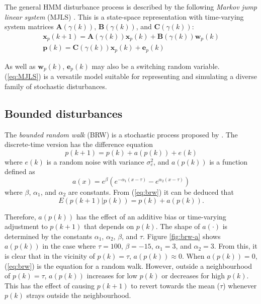 The general HMM disturbance process is described by the following \textit{Markov jump linear system} (MJLS) \citep{costa_discrete-time_2005}. This is a state-space representation with time-varying system matrices $\mathbf{A}(\gamma(k))$, $\mathbf{B}(\gamma(k))$, and $\mathbf{C}(\gamma(k))$:
\begin{equation} \label{eq:MJLS}
	\begin{split}
	\mathbf{x}_p(k+1) = \mathbf{A}(\gamma(k)) \mathbf{x}_p(k) + \mathbf{B}(\gamma(k))\mathbf{w}_p(k) \\
	\mathbf{p}(k) = \mathbf{C}(\gamma(k)) \mathbf{x}_p(k) + \mathbf{e}_p(k)
	\end{split}
\end{equation}

As well as $\mathbf{w}_p(k)$, $\mathbf{e}_p(k)$ may also be a switching random variable. (\ref{eq:MJLS}) is a versatile model suitable for representing and simulating a diverse family of stochastic disturbances.

\subsection{Bounded disturbances}

The \textit{bounded random walk} (BRW) is a stochastic process proposed by \cite{nicolau_stationary_2002}. The discrete-time version has the difference equation
\begin{equation} \label{eq:brw}
		p(k+1) = p(k) + a(p(k)) + e(k)
\end{equation}
where $e(k)$ is a random noise with variance $\sigma_e^2$, and $a(p(k))$ is a function defined as
\begin{equation}
	a(x) = e^{\beta}\left(e^{-\alpha_{1}\left(x - \tau\right)} - e^{\alpha_{2}\left(x - \tau\right)}\right)
\end{equation}
where $\beta$, $\alpha_{1}$, and $\alpha_{2}$ are constants.  From (\ref{eq:brw}) it can be deduced that
\begin{equation}
	E(p(k+1)|p(k)) = p(k) + a(p(k)).
\end{equation}

Therefore, $a(p(k))$ has the effect of an additive bias or time-varying adjustment to $p(k+1)$ that depends on $p(k)$. The shape of $a(\cdot)$ is determined by the constants $\alpha_{1}$,  $\alpha_{2}$, $\beta$, and $\tau$. Figure \ref{fig:brw-a} shows $a(p(k))$ in the case where $\tau=100$, $\beta=-15$, $\alpha_{1}=3$, and $\alpha_{2}=3$.  From this, it is clear that in the vicinity of $p(k)=\tau$, $a(p(k))\approx0$. When $a(p(k))=0$, (\ref{eq:brw}) is the equation for a random walk. However, outside a neighbourhood of $p(k)=\tau$, $a(p(k))$ increases for low $p(k)$ or decreases for high $p(k)$. This has the effect of causing $p(k+1)$ to revert towards the mean ($\tau$) whenever $p(k)$ strays outside the neighbourhood. 

